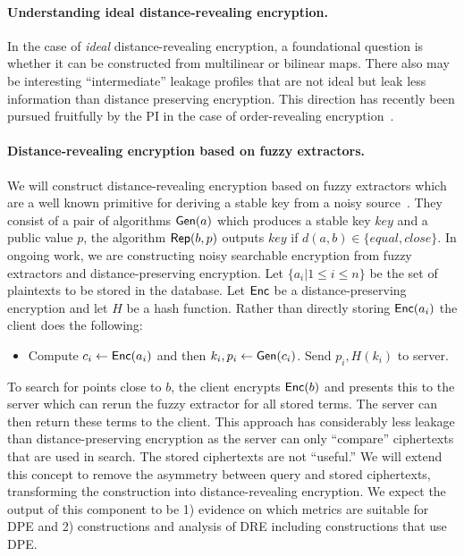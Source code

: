 \paragraph{Understanding ideal distance-revealing encryption.}
In the case of \emph{ideal} distance-revealing encryption, a foundational question is whether it can be constructed from multilinear or bilinear maps.  There also may be interesting ``intermediate'' leakage profiles that are not ideal but leak less information than distance preserving encryption.   This direction has recently been pursued fruitfully by the PI in the case of order-revealing encryption~\cite{EPRINT:CLOZ16}.

\paragraph{Distance-revealing encryption based on fuzzy extractors.}
We will construct distance-revealing encryption based on fuzzy extractors which are a well known primitive for deriving a stable key from a noisy source~\cite{EC:DodReySmi04}.  They consist of a pair of algorithms $\mathsf{Gen}(a)$ which produces a stable key $key$ and a public value $p$, the algorithm $\mathsf{Rep}(b, p)$ outputs $key$ if $d(a,b)\in\{equal,close\}$.  In ongoing work, we are constructing noisy searchable encryption from fuzzy extractors and distance-preserving encryption.  Let $\{a_i | 1\le i \le n\}$ be the set of plaintexts to be stored in the database.  Let $\mathsf{Enc}$ be a distance-preserving encryption and let $H$ be a hash function.  Rather than directly storing $\mathsf{Enc}(a_i)$ the client does the following:

\begin{itemize}\setlength\itemsep{0em}
\item Compute $c_i \leftarrow \mathsf{Enc}(a_i)$ and then $k_i, p_i \leftarrow \mathsf{Gen}(c_i)$. Send $p_i, H(k_i)$ to server.
\end{itemize}

To search for points close to $b$, the client encrypts $\mathsf{Enc}(b)$ and presents this to the server which can rerun the fuzzy extractor for all stored terms.  The server can then return these terms to the client.  This approach has considerably less leakage than distance-preserving encryption as the server can only ``compare'' ciphertexts that are used in search.  The stored ciphertexts are not ``useful.''  We will extend this concept to remove the asymmetry between query and stored ciphertexts, transforming the construction into distance-revealing encryption.
We expect the output of this component to be 1) evidence on which metrics are suitable for DPE  and 2) constructions and analysis of DRE including constructions that use DPE.  

